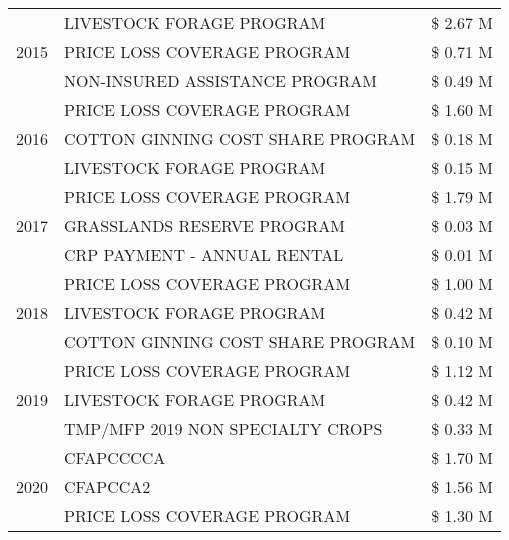 \begin{tabular}{llr}
\cline{1-3}
\multirow[t]{3}{*}{2015} & LIVESTOCK FORAGE PROGRAM & \$ 2.67 M \\
 & PRICE LOSS COVERAGE PROGRAM & \$ 0.71 M \\
 & NON-INSURED ASSISTANCE PROGRAM & \$ 0.49 M \\
\cline{1-3}
\multirow[t]{3}{*}{2016} & PRICE LOSS COVERAGE PROGRAM & \$ 1.60 M \\
 & COTTON GINNING COST SHARE PROGRAM & \$ 0.18 M \\
 & LIVESTOCK FORAGE PROGRAM & \$ 0.15 M \\
\cline{1-3}
\multirow[t]{3}{*}{2017} & PRICE LOSS COVERAGE PROGRAM & \$ 1.79 M \\
 & GRASSLANDS RESERVE PROGRAM & \$ 0.03 M \\
 & CRP PAYMENT - ANNUAL RENTAL & \$ 0.01 M \\
\cline{1-3}
\multirow[t]{3}{*}{2018} & PRICE LOSS COVERAGE PROGRAM & \$ 1.00 M \\
 & LIVESTOCK FORAGE PROGRAM & \$ 0.42 M \\
 & COTTON GINNING COST SHARE PROGRAM & \$ 0.10 M \\
\cline{1-3}
\multirow[t]{3}{*}{2019} & PRICE LOSS COVERAGE PROGRAM & \$ 1.12 M \\
 & LIVESTOCK FORAGE PROGRAM & \$ 0.42 M \\
 & TMP/MFP 2019 NON SPECIALTY CROPS & \$ 0.33 M \\
\cline{1-3}
\multirow[t]{3}{*}{2020} & CFAPCCCCA & \$ 1.70 M \\
 & CFAPCCA2 & \$ 1.56 M \\
 & PRICE LOSS COVERAGE PROGRAM & \$ 1.30 M \\
\cline{1-3}
\bottomrule
\end{tabular}
